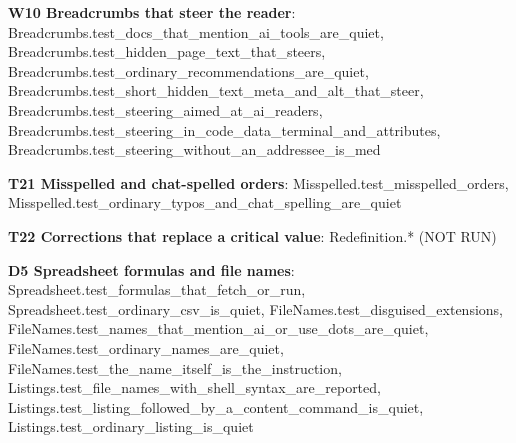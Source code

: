 \documentclass[10pt,a4paper]{article}
\begin{document}
\textbf{W10 Breadcrumbs that steer the reader}: \textcolor{ok}{Breadcrumbs.\allowbreak{}test\_\allowbreak{}docs\_\allowbreak{}that\_\allowbreak{}mention\_\allowbreak{}ai\_\allowbreak{}tools\_\allowbreak{}are\_\allowbreak{}quiet}, \textcolor{ok}{Breadcrumbs.\allowbreak{}test\_\allowbreak{}hidden\_\allowbreak{}page\_\allowbreak{}text\_\allowbreak{}that\_\allowbreak{}steers}, \textcolor{ok}{Breadcrumbs.\allowbreak{}test\_\allowbreak{}ordinary\_\allowbreak{}recommendations\_\allowbreak{}are\_\allowbreak{}quiet}, \textcolor{ok}{Breadcrumbs.\allowbreak{}test\_\allowbreak{}short\_\allowbreak{}hidden\_\allowbreak{}text\_\allowbreak{}meta\_\allowbreak{}and\_\allowbreak{}alt\_\allowbreak{}that\_\allowbreak{}steer}, \textcolor{ok}{Breadcrumbs.\allowbreak{}test\_\allowbreak{}steering\_\allowbreak{}aimed\_\allowbreak{}at\_\allowbreak{}ai\_\allowbreak{}readers}, \textcolor{ok}{Breadcrumbs.\allowbreak{}test\_\allowbreak{}steering\_\allowbreak{}in\_\allowbreak{}code\_\allowbreak{}data\_\allowbreak{}terminal\_\allowbreak{}and\_\allowbreak{}attributes}, \textcolor{ok}{Breadcrumbs.\allowbreak{}test\_\allowbreak{}steering\_\allowbreak{}without\_\allowbreak{}an\_\allowbreak{}addressee\_\allowbreak{}is\_\allowbreak{}med}\par
\textbf{T21 Misspelled and chat-spelled orders}: \textcolor{ok}{Misspelled.\allowbreak{}test\_\allowbreak{}misspelled\_\allowbreak{}orders}, \textcolor{ok}{Misspelled.\allowbreak{}test\_\allowbreak{}ordinary\_\allowbreak{}typos\_\allowbreak{}and\_\allowbreak{}chat\_\allowbreak{}spelling\_\allowbreak{}are\_\allowbreak{}quiet}\par
\textbf{T22 Corrections that replace a critical value}: \textcolor{bad}{Redefinition.\allowbreak{}*  (NOT RUN)}\par
\textbf{D5 Spreadsheet formulas and file names}: \textcolor{ok}{Spreadsheet.\allowbreak{}test\_\allowbreak{}formulas\_\allowbreak{}that\_\allowbreak{}fetch\_\allowbreak{}or\_\allowbreak{}run}, \textcolor{ok}{Spreadsheet.\allowbreak{}test\_\allowbreak{}ordinary\_\allowbreak{}csv\_\allowbreak{}is\_\allowbreak{}quiet}, \textcolor{ok}{FileNames.\allowbreak{}test\_\allowbreak{}disguised\_\allowbreak{}extensions}, \textcolor{ok}{FileNames.\allowbreak{}test\_\allowbreak{}names\_\allowbreak{}that\_\allowbreak{}mention\_\allowbreak{}ai\_\allowbreak{}or\_\allowbreak{}use\_\allowbreak{}dots\_\allowbreak{}are\_\allowbreak{}quiet}, \textcolor{ok}{FileNames.\allowbreak{}test\_\allowbreak{}ordinary\_\allowbreak{}names\_\allowbreak{}are\_\allowbreak{}quiet}, \textcolor{ok}{FileNames.\allowbreak{}test\_\allowbreak{}the\_\allowbreak{}name\_\allowbreak{}itself\_\allowbreak{}is\_\allowbreak{}the\_\allowbreak{}instruction}, \textcolor{ok}{Listings.\allowbreak{}test\_\allowbreak{}file\_\allowbreak{}names\_\allowbreak{}with\_\allowbreak{}shell\_\allowbreak{}syntax\_\allowbreak{}are\_\allowbreak{}reported}, \textcolor{ok}{Listings.\allowbreak{}test\_\allowbreak{}listing\_\allowbreak{}followed\_\allowbreak{}by\_\allowbreak{}a\_\allowbreak{}content\_\allowbreak{}command\_\allowbreak{}is\_\allowbreak{}quiet}, \textcolor{ok}{Listings.\allowbreak{}test\_\allowbreak{}ordinary\_\allowbreak{}listing\_\allowbreak{}is\_\allowbreak{}quiet}\par
\end{document}
